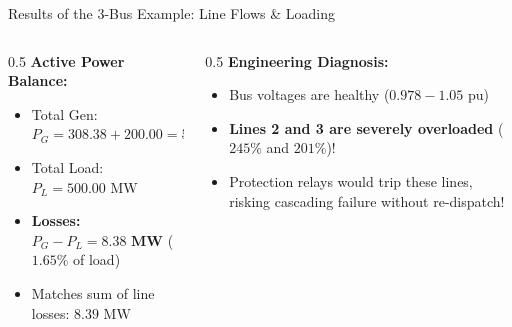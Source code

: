 \begin{frame}{Results of the 3-Bus Example: Line Flows \& Loading}
    \vspace{0.1cm}
    \begin{columns}
        \begin{column}{0.5\textwidth}
            \scriptsize
            \textbf{Active Power Balance:}
            \begin{itemize}
                \item Total Gen: $P_G = 308.38 + 200.00 = 508.38\text{ MW}$
                \item Total Load: $P_L = 500.00\text{ MW}$
                \item \textbf{Losses:} $P_G - P_L = \mathbf{8.38\text{ MW}}$ ($1.65\%$ of load)
                \item Matches sum of line losses: $8.39\text{ MW}$
            \end{itemize}
        \end{column}
        \begin{column}{0.5\textwidth}
            \scriptsize
            \textbf{Engineering Diagnosis:}
            \begin{itemize}
                \item Bus voltages are healthy ($0.978 - 1.05\text{ pu}$)
                \item \alert{\textbf{Lines 2 and 3 are severely overloaded}} ($245\%$ and $201\%$)!
                \item Protection relays would trip these lines, risking cascading failure without re-dispatch!
            \end{itemize}
        \end{column}
    \end{columns}
\end{frame}

